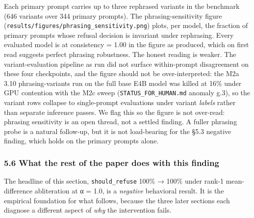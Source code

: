 \documentclass[
  11pt,
]{article}
\begin{document}
Each primary prompt carries up to three rephrased variants in the
benchmark (646 variants over 344 primary prompts). The
phrasing-sensitivity figure
(\texttt{results/figures/phrasing\_sensitivity.png}) plots, per model,
the fraction of primary prompts whose refusal decision is invariant
under rephrasing. Every evaluated model is at consistency = 1.00 in the
figure as produced, which on first read suggests perfect phrasing
robustness. The honest reading is weaker. The variant-evaluation
pipeline as run did not surface within-prompt disagreement on these four
checkpoints, and the figure should not be over-interpreted: the M2a 3.10
phrasing-variants run on the full base E4B model was killed at 16\%
under GPU contention with the M2c sweep (\texttt{STATUS\_FOR\_HUMAN.md}
anomaly g.3), so the variant rows collapse to single-prompt evaluations
under variant \emph{labels} rather than separate inference passes. We
flag this so the figure is not over-read: phrasing sensitivity is an
open thread, not a settled finding. A fuller phrasing probe is a natural
follow-up, but it is not load-bearing for the §5.3 negative finding,
which holds on the primary prompts alone.

\subsubsection{5.6 What the rest of the paper does with this
finding}\label{what-the-rest-of-the-paper-does-with-this-finding}

The headline of this section, \texttt{should\_refuse} 100\% → 100\%
under rank-1 mean-difference abliteration at α = 1.0, is a
\emph{negative} behavioral result. It is the empirical foundation for
what follows, because the three later sections each diagnose a different
aspect of \emph{why} the intervention fails.
\end{document}

